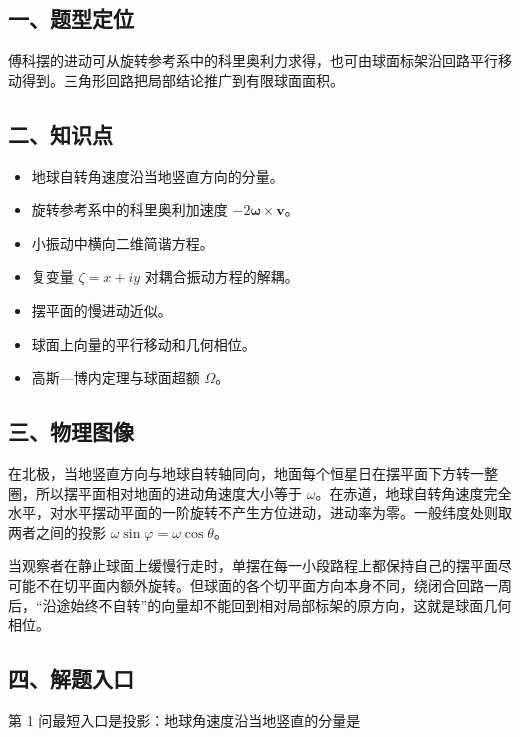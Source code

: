 \documentclass[12pt,a4paper,UTF8]{ctexart}
\newcommand{\tightlist}{\setlength{\itemsep}{0pt}\setlength{\parskip}{0pt}}
\begin{document}
\subsection{一、题型定位}\label{ux4e00ux9898ux578bux5b9aux4f4d-5}

傅科摆的进动可从旋转参考系中的科里奥利力求得，也可由球面标架沿回路平行移动得到。三角形回路把局部结论推广到有限球面面积。

\subsection{二、知识点}\label{ux4e8cux77e5ux8bc6ux70b9-5}

\begin{itemize}
\tightlist
\item
  地球自转角速度沿当地竖直方向的分量。
\item
  旋转参考系中的科里奥利加速度 \(-2\bm\omega\times\bm v\)。
\item
  小振动中横向二维简谐方程。
\item
  复变量 \(\zeta=x+iy\) 对耦合振动方程的解耦。
\item
  摆平面的慢进动近似。
\item
  球面上向量的平行移动和几何相位。
\item
  高斯---博内定理与球面超额 \(\Omega\)。
\end{itemize}

\subsection{三、物理图像}\label{ux4e09ux7269ux7406ux56feux50cf-5}

在北极，当地竖直方向与地球自转轴同向，地面每个恒星日在摆平面下方转一整圈，所以摆平面相对地面的进动角速度大小等于
\(\omega\)。在赤道，地球自转角速度完全水平，对水平摆动平面的一阶旋转不产生方位进动，进动率为零。一般纬度处则取两者之间的投影
\(\omega\sin\varphi=\omega\cos\theta\)。

当观察者在静止球面上缓慢行走时，单摆在每一小段路程上都保持自己的摆平面尽可能不在切平面内额外旋转。但球面的各个切平面方向本身不同，绕闭合回路一周后，``沿途始终不自转''的向量却不能回到相对局部标架的原方向，这就是球面几何相位。

\subsection{四、解题入口}\label{ux56dbux89e3ux9898ux5165ux53e3-5}

第 1 问最短入口是投影：地球角速度沿当地竖直的分量是
\end{document}
